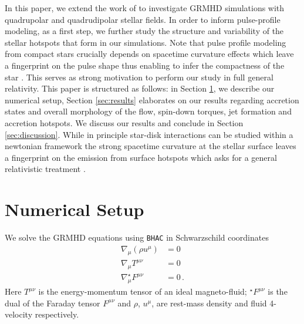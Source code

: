 \documentclass[fleqn,usenatbib]{mnras}
\newcommand{\bhac}{\texttt{BHAC}\xspace}
\begin{document}
In this paper, we extend the work of  to investigate GRMHD simulations with quadrupolar and quadrudipolar stellar fields.  In order to inform pulse-profile modeling, as a first step, we further study the structure and variability of the stellar hotspots that form in our simulations. Note that pulse profile modeling from compact stars crucially depends on spacetime curvature effects which leave a fingerprint on the pulse shape thus enabling to infer the compactness of the star \citep{PatrunoandWatts2012}.  This serves as strong motivation to perform our study in full general relativity.  
This paper is structured as follows: in Section \ref{sec:setup}, we describe our numerical setup, Section \ref{sec:results} elaborates on our results regarding accretion states and overall morphology of the flow, spin-down torques, jet formation and accretion hotspots.  We discuss our results and conclude in Section \ref{sec:discussion}.  
While in principle star-disk interactions can be studied within a newtonian framework the strong spacetime curvature at the stellar surface leaves a fingerprint on the emission from surface hotspots which asks for a general relativistic treatment \citep{PatrunoandWatts2012}.  

\section{Numerical Setup}\label{sec:setup}

We solve the GRMHD equations using \bhac \citep{Porth2017, Olivares2019} in Schwarzschild coordinates  
\begin{align}
\nabla_{\mu}(\rho u^{\mu}) &= 0 \\
\nabla_{\mu} T^{\mu\nu} &= 0 \\
\nabla_{\mu} ^{\star}F^{\mu\nu} &= 0 \, .
\end{align}
Here $T^{\mu\nu}$ is the energy-momentum tensor of an ideal magneto-fluid; $^{\star}F^{\mu\nu}$ is the dual of the Faraday tensor $F^{\mu\nu}$ and $\rho$,  $u^{\mu}$, are rest-mass density and fluid 4-velocity respectively. 
\end{document}
